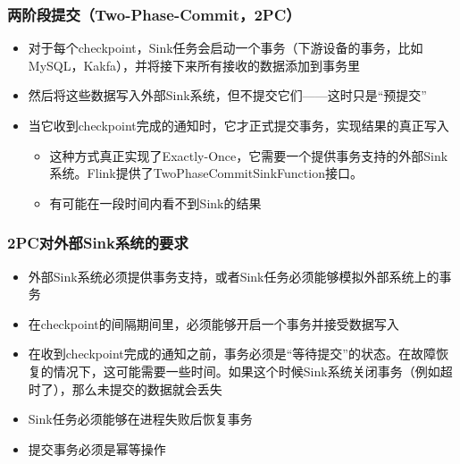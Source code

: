 \documentclass{beamer}
\begin{document}
  \begin{frame}
      \frametitle{两阶段提交（Two-Phase-Commit，2PC）}
  
      \begin{itemize}
          \item 对于每个checkpoint，Sink任务会启动一个事务（下游设备的事务，比如MySQL，Kakfa），并将接下来所有接收的数据添加到事务里
          \item 然后将这些数据写入外部Sink系统，但不提交它们——这时只是“预提交”
          \item 当它收到checkpoint完成的通知时，它才正式提交事务，实现结果的真正写入
          \begin{itemize}
              \item 这种方式真正实现了Exactly-Once，它需要一个提供事务支持的外部Sink系统。Flink提供了TwoPhaseCommitSinkFunction接口。
              \item 有可能在一段时间内看不到Sink的结果
          \end{itemize}
      \end{itemize}
  
  \end{frame}

  \begin{frame}
      \frametitle{2PC对外部Sink系统的要求}
  
      \begin{itemize}
          \item 外部Sink系统必须提供事务支持，或者Sink任务必须能够模拟外部系统上的事务
          \item 在checkpoint的间隔期间里，必须能够开启一个事务并接受数据写入
          \item 在收到checkpoint完成的通知之前，事务必须是“等待提交”的状态。在故障恢复的情况下，这可能需要一些时间。如果这个时候Sink系统关闭事务（例如超时了），那么未提交的数据就会丢失
          \item Sink任务必须能够在进程失败后恢复事务
          \item 提交事务必须是幂等操作
      \end{itemize}
  
  \end{frame}
\end{document}
